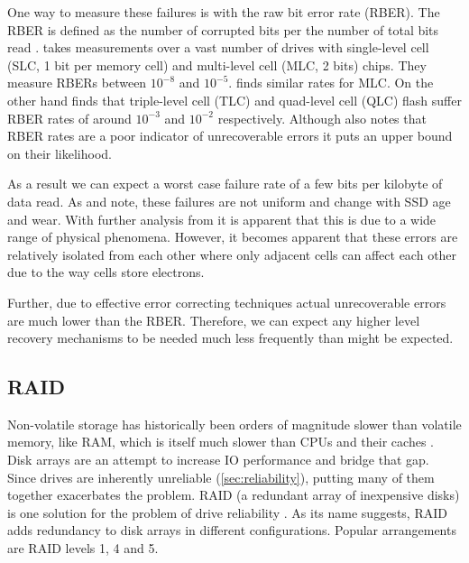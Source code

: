             One way to measure these failures is with the raw bit error rate
            (RBER). The RBER is defined as the number of corrupted bits per the
            number of total bits read \cite{flash_reliability}.
             takes measurements over a vast
            number of drives with single-level cell (SLC, 1 bit per memory
            cell) and multi-level cell (MLC, 2 bits) chips. They measure RBERs
            between $10^{-8}$ and $10^{-5}$.  finds
            similar rates for MLC. On the other hand 
            finds that triple-level cell (TLC) and quad-level cell (QLC) flash
            suffer RBER rates of around $10^{-3}$ and $10^{-2}$ respectively.
            Although  also notes that RBER rates
            are a poor indicator of unrecoverable errors it puts an upper bound
            on their likelihood.

            As a result we can expect a worst case failure rate of a few bits
            per kilobyte of data read. As  and
             note, these failures are not uniform
            and change with SSD age and wear. With further analysis from
             it is apparent that this is due to
            a wide range of physical phenomena. However, it becomes apparent
            that these errors are relatively isolated from each other where
            only adjacent cells can affect each other due to the way cells
            store electrons.

            Further, due to effective error correcting techniques
            \cite{flash_reliability, bit_error_mlc, bit_error_qlc,
            flash_error_manual} actual unrecoverable errors are much lower than
            the RBER. Therefore, we can expect any higher level recovery
            mechanisms to be needed much less frequently than might be
            expected.

        \subsection{RAID}
            \label{sec:RAID}

            Non-volatile storage has historically been orders of magnitude
            slower than volatile memory, like RAM, which is itself much slower
            than CPUs and their caches \cite{IO_bottleneck}. Disk arrays are an
            attempt to increase IO performance and bridge that gap. Since
            drives are inherently unreliable (\autoref{sec:reliability}), putting
            many of them together exacerbates the problem. RAID (a redundant
            array of inexpensive disks) is one solution for the problem of
            drive reliability \cite{RAID}. As its name suggests, RAID adds
            redundancy to disk arrays in different configurations. Popular
            arrangements are RAID levels 1, 4 and 5.

